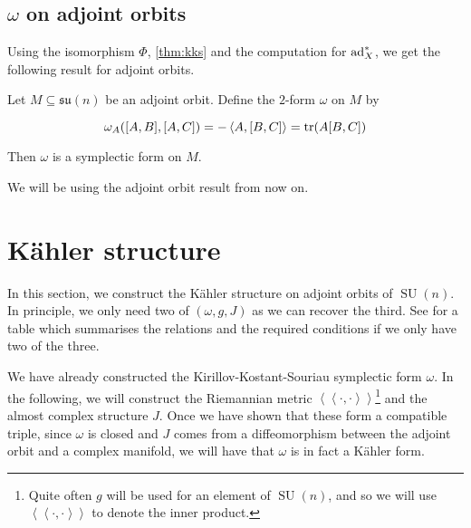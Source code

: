 \documentclass{article}
\DeclareMathOperator{\SU}{SU}
\newcommand{\su}{\mathfrak{su}}
\newcommand{\iinner}[1]{\left\langle\!\left\langle #1 \right\rangle\!\right\rangle}
\begin{document}
\subsection{\(\omega\) on adjoint orbits}

Using the isomorphism \(\Phi\), \cref{thm:kks} and the computation for \(\operatorname{ad}_X^*\), we get the following result for adjoint orbits.

\begin{theorem}
    Let \(M \subseteq \su(n)\) be an adjoint orbit. Define the \(2\)-form \(\omega\) on \(M\) by

    \[\omega_A([A, B], [A, C]) = -\left\langle A, [B, C] \right\rangle = \tr(A[B, C])\]

    Then \(\omega\) is a symplectic form on \(M\).
\end{theorem}

We will be using the adjoint orbit result from now on.



\section{K\"ahler structure}

In this section, we construct the K\"ahler structure on adjoint orbits of \(\SU(n)\). In principle, we only need two of \((\omega, g, J)\) as we can recover the third. See  \cite[\S 13.2]{cannas_da_silva} for a table which summarises the relations and the required conditions if we only have two of the three.

We have already constructed the Kirillov-Kostant-Souriau symplectic form \(\omega\). In the following, we will construct the Riemannian metric \(\iinner{\cdot, \cdot}\)\footnote{Quite often \(g\) will be used for an element of \(\SU(n)\), and so we will use \(\iinner{\cdot, \cdot}\) to denote the inner product.} and the almost complex structure \(J\). Once we have shown that these form a compatible triple, since \(\omega\) is closed and \(J\) comes from a diffeomorphism between the adjoint orbit and a complex manifold, we will have that \(\omega\) is in fact a K\"ahler form.
\end{document}
